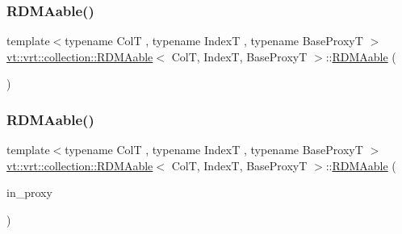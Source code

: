 \mbox{\label{structvt_1_1vrt_1_1collection_1_1_r_d_m_aable_a5b5055174533c011cc0fb8d0eb36b13c}} 
\subsubsection{\texorpdfstring{R\+D\+M\+Aable()}{RDMAable()}\hspace{0.1cm}{\footnotesize\ttfamily [3/4]}}
{\footnotesize\ttfamily template$<$typename ColT , typename IndexT , typename Base\+ProxyT $>$ \\
\hyperlink{structvt_1_1vrt_1_1collection_1_1_r_d_m_aable}{vt\+::vrt\+::collection\+::\+R\+D\+M\+Aable}$<$ ColT, IndexT, Base\+ProxyT $>$\+::\hyperlink{structvt_1_1vrt_1_1collection_1_1_r_d_m_aable}{R\+D\+M\+Aable} (\begin{DoxyParamCaption}\item[{\hyperlink{structvt_1_1vrt_1_1collection_1_1_r_d_m_aable}{R\+D\+M\+Aable}$<$ ColT, IndexT, Base\+ProxyT $>$ \&\&}]{ }\end{DoxyParamCaption})\hspace{0.3cm}{\ttfamily [default]}}

\mbox{\label{structvt_1_1vrt_1_1collection_1_1_r_d_m_aable_a8e246341e17012efae4f42b6d317595e}} 
\subsubsection{\texorpdfstring{R\+D\+M\+Aable()}{RDMAable()}\hspace{0.1cm}{\footnotesize\ttfamily [4/4]}}
{\footnotesize\ttfamily template$<$typename ColT , typename IndexT , typename Base\+ProxyT $>$ \\
\hyperlink{structvt_1_1vrt_1_1collection_1_1_r_d_m_aable}{vt\+::vrt\+::collection\+::\+R\+D\+M\+Aable}$<$ ColT, IndexT, Base\+ProxyT $>$\+::\hyperlink{structvt_1_1vrt_1_1collection_1_1_r_d_m_aable}{R\+D\+M\+Aable} (\begin{DoxyParamCaption}\item[{\hyperlink{namespacevt_a1b417dd5d684f045bb58a0ede70045ac}{Virtual\+Proxy\+Type} const}]{in\+\_\+proxy }\end{DoxyParamCaption})}



